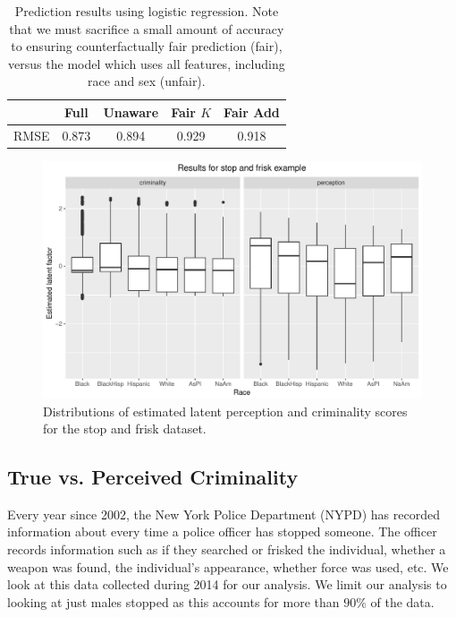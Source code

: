 \begin{table}
\centering
\caption{Prediction results using logistic regression. Note that we must sacrifice a small amount of accuracy to ensuring counterfactually fair prediction (fair), versus the model which uses all features, including race and sex (unfair).}\label{table.pred_law}
\begin{tabular}{ccccc} 
\hline
 &  {\bf Full} & {\bf Unaware} & {\bf Fair $K$} & {\bf Fair Add} \\
\hline
RMSE & 0.873 & 0.894 & 0.929 & 0.918 \\
\hline
\end{tabular}
\end{table}

\begin{figure}[!th]
\begin{center}
\vspace{-1ex}
\centerline{\includegraphics[width=\columnwidth]{stopandfrisk_output.pdf}}
\vspace{-2ex}
\caption{Distributions of estimated latent perception and criminality scores for the stop and frisk dataset.\label{figure.stop_and_frisk_output}\vspace{-5ex}}
\vspace{-2ex}
\end{center}
\end{figure}


\subsection{True vs. Perceived Criminality}
\label{sec:true-vs.-perceived}
Every year since 2002, the New York Police Department (NYPD) has recorded information about every time a police officer has stopped someone. The officer records information such as if they searched or frisked the individual, whether a weapon was found, the individual's appearance, whether force was used, etc. We look at this data collected during 2014 for our analysis. We limit our analysis to looking at just males stopped as this accounts for more than $90\%$ of the data.

